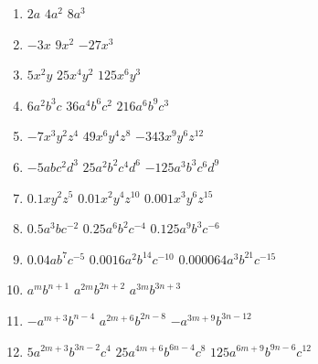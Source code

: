 \begin{solution} \hfill \vspace{-0.5cm}
\begin{enumerate}
\item $2a$ \hspace{5mm}	$4{{a}^{2}}$\hspace{5mm}	$8{{a}^{3}}$
\item $-3x$\hspace{5mm}	$9{{x}^{2}}$\hspace{5mm}	$-27{{x}^{3}}$
\item $5{{x}^{2}}y$\hspace{5mm}	$25{{x}^{4}}{{y}^{2}}$\hspace{5mm}	$125{{x}^{6}}{{y}^{3}}$
\item $6{{a}^{2}}{{b}^{3}}c$\hspace{5mm}	$36{{a}^{4}}{{b}^{6}}{{c}^{2}}$\hspace{5mm}	$216{{a}^{6}}{{b}^{9}}{{c}^{3}}$
\item $-7{{x}^{3}}{{y}^{2}}{{z}^{4}}$\hspace{5mm}	$49{{x}^{6}}{{y}^{4}}{{z}^{8}}$\hspace{5mm}	$-343{{x}^{9}}{{y}^{6}}{{z}^{12}}$
\item $-5ab{{c}^{2}}{{d}^{3}}$\hspace{5mm}	$25{{a}^{2}}{{b}^{2}}{{c}^{4}}{{d}^{6}}$\hspace{5mm}	$-125{{a}^{3}}{{b}^{3}}{{c}^{6}}{{d}^{9}}$
\item $0.1x{{y}^{2}}{{z}^{5}}$\hspace{5mm}	$0.01{{x}^{2}}{{y}^{4}}{{z}^{10}}$\hspace{5mm}	$0.001{{x}^{3}}{{y}^{6}}{{z}^{15}}$
\item $0.5{{a}^{3}}b{{c}^{-2}}$\hspace{5mm}	$0.25{{a}^{6}}{{b}^{2}}{{c}^{-4}}$\hspace{5mm}	$0.125{{a}^{9}}{{b}^{3}}{{c}^{-6}}$
\item $0.04a{{b}^{7}}{{c}^{-5}}$\hspace{5mm}	$0.0016{{a}^{2}}{{b}^{14}}{{c}^{-10}}$\hspace{5mm}	$0.000064{{a}^{3}}{{b}^{21}}{{c}^{-15}}$
\item ${{a}^{m}}{{b}^{n+1}}$\hspace{5mm}	${{a}^{2m}}{{b}^{2n+2}}$\hspace{5mm}	${{a}^{3m}}{{b}^{3n+3}}$
\item $-{{a}^{m+3}}{{b}^{n-4}}$\hspace{5mm}	${{a}^{2m+6}}{{b}^{2n-8}}$\hspace{5mm}	$-{{a}^{3m+9}}{{b}^{3n-12}}$
\item $5{{a}^{2m+3}}{{b}^{3n-2}}{{c}^{4}}$\hspace{5mm}	$25{{a}^{4m+6}}{{b}^{6n-4}}{{c}^{8}}$\hspace{5mm}	$125{{a}^{6m+9}}{{b}^{9n-6}}{{c}^{12}}$
\end{enumerate}
\end{solution}

